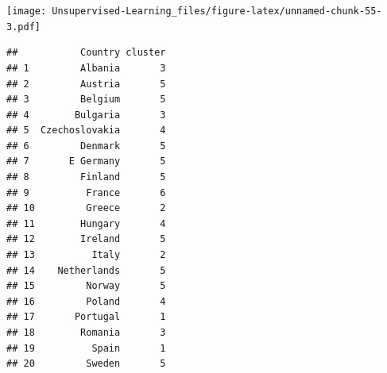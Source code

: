 \documentclass[
]{book}
\newenvironment{Shaded}{\begin{snugshade}}{\end{snugshade}}
\newcommand{\CommentTok}[1]{\textcolor[rgb]{0.56,0.35,0.01}{\textit{#1}}}
\newcommand{\DecValTok}[1]{\textcolor[rgb]{0.00,0.00,0.81}{#1}}
\newcommand{\KeywordTok}[1]{\textcolor[rgb]{0.13,0.29,0.53}{\textbf{#1}}}
\newcommand{\NormalTok}[1]{#1}
\newcommand{\OperatorTok}[1]{\textcolor[rgb]{0.81,0.36,0.00}{\textbf{#1}}}
\newcommand{\StringTok}[1]{\textcolor[rgb]{0.31,0.60,0.02}{#1}}
\begin{document}
\texttt{[image: Unsupervised-Learning\_files/figure-latex/unnamed-chunk-55-3.pdf]}

\begin{Shaded}
\end{Shaded}

\begin{verbatim}
##           Country cluster
## 1         Albania       3
## 2         Austria       5
## 3         Belgium       5
## 4        Bulgaria       3
## 5  Czechoslovakia       4
## 6         Denmark       5
## 7       E Germany       5
## 8         Finland       5
## 9          France       6
## 10         Greece       2
## 11        Hungary       4
## 12        Ireland       5
## 13          Italy       2
## 14    Netherlands       5
## 15         Norway       5
## 16         Poland       4
## 17       Portugal       1
## 18        Romania       3
## 19          Spain       1
## 20         Sweden       5
\end{verbatim}

  
\end{document}
